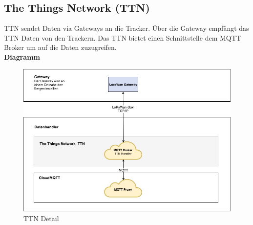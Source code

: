 \documentclass[11pt,english,german]{report}
\theoremstyle{definition}
\begin{document}
\subsection{The Things Network (TTN)}
TTN sendet Daten via Gateways an die Tracker. Über die Gateway empfängt das TTN Daten von den Trackern. Das TTN bietet einen Schnittstelle dem MQTT Broker um auf die Daten zuzugreifen.\\[0.3cm]
\textbf{Diagramm}
\begin{figure}[H]
	\centering
	\includegraphics[width=\textwidth]{img/system/ATAS_SystemOverview_TTN_BA.jpg}
	\caption[TTN Detail]
	{TTN Detail}
\end{figure}

\newpage
\end{document}
